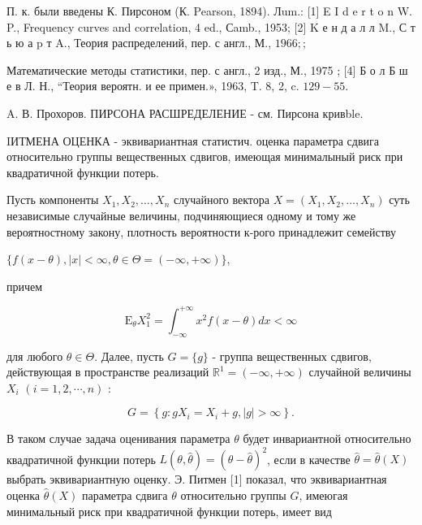 \documentclass[10pt]{article}
\begin{document}
П. к. были введены К. Пирсоном (К. Pearson, 1894). Лum.: [1] E I d e r t o n W. P., Frequency curves and correlation, 4 ed., Сamb., 1953; [2] K е н д а л л M., С т ь ю а p т A., Теория распределений, пер. с англ., М., $1966 ;$;

Математические методы статистики, пер. с англ., 2 изд., М., 1975 ; [4] Б о л Б ш е в Л. Н., “Теория вероятн. и ее примен.», 1963, T. 8, 2, c. $129-55$.

A. В. Прохоров. ПИРСОНА РАСШРЕДЕЛЕНИЕ - см. Пирсона кривble.



IИТМЕНА ОЦЕНКА - эквивариантная статистич. оценка параметра сдвига относительно группы вещественных сдвигов, имеющая минималыный риск при квадратичной функции потерь.



Пусть компоненты $X_{1}, X_{2}, \ldots, X_{n}$ случайного вектора $X=\left(X_{1}, X_{2}, \ldots, X_{n}\right)$ суть независимые случайные величины, подчиняющиеся одному и тому же вероятностному закону, плотность вероятности к-рого принадлежит семейству



$\{f(x-\theta),|x|<\infty, \theta \in \Theta=(-\infty,+\infty)\}$,



причем



\[

\mathrm{E}_{\theta} X_{1}^{2}=\int_{-\infty}^{+\infty} x^{2} f(x-\theta) d x<\infty

\]



для любого $\theta \in \Theta$. Далее, пусть $G=\{g\}$ - группа вещественных сдвигов, действующая в пространстве реализаций $\mathbb{R}^{1}=(-\infty,+\infty)$ случайной величины $X_{i}$ $(i=1,2, \cdots, n)$ :



\[

G=\left\{g: g X_{i}=X_{i}+g,|g|>\infty\right\} .

\]



В таком случае задача оценивания параметра $\theta$ будет инвариантной относительно квадратичной функции потерь $L(\theta, \hat{\theta})=(\theta-\hat{\theta})^{2}$, если в качестве $\hat{\theta}=\hat{\theta}(X)$ выбрать эквивариантную оценку. Э. Питмен [1] показал, что эквивариантная оценка $\hat{\theta}(X)$ параметра сдвига $\theta$ относительно группы $G$, имеюгая минимальный риск при квадратичной функции потерь, имеет вид
\end{document}
